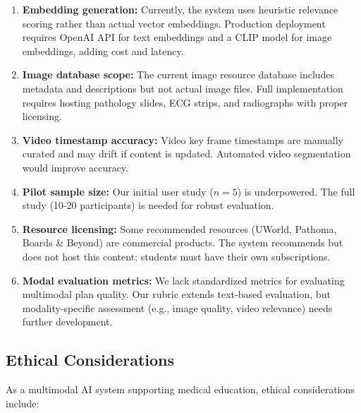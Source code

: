 \begin{enumerate}
    \item \textbf{Embedding generation:} Currently, the system uses heuristic relevance scoring rather than actual vector embeddings. Production deployment requires OpenAI API for text embeddings and a CLIP model for image embeddings, adding cost and latency.
    
    \item \textbf{Image database scope:} The current image resource database includes metadata and descriptions but not actual image files. Full implementation requires hosting pathology slides, ECG strips, and radiographs with proper licensing.
    
    \item \textbf{Video timestamp accuracy:} Video key frame timestamps are manually curated and may drift if content is updated. Automated video segmentation would improve accuracy.
    
    \item \textbf{Pilot sample size:} Our initial user study ($n=5$) is underpowered. The full study (10-20 participants) is needed for robust evaluation.
    
    \item \textbf{Resource licensing:} Some recommended resources (UWorld, Pathoma, Boards \& Beyond) are commercial products. The system recommends but does not host this content; students must have their own subscriptions.
    
    \item \textbf{Modal evaluation metrics:} We lack standardized metrics for evaluating multimodal plan quality. Our rubric extends text-based evaluation, but modality-specific assessment (e.g., image quality, video relevance) needs further development.
\end{enumerate}

\subsection{Ethical Considerations}

As a multimodal AI system supporting medical education, ethical considerations include:

